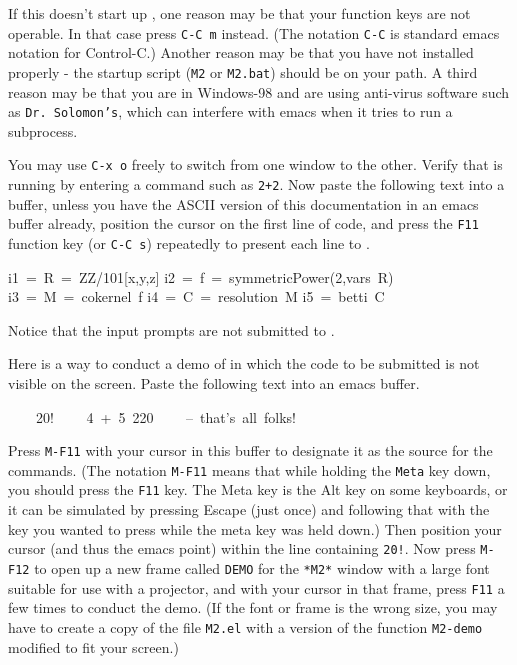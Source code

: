 If this doesn't start up \Mtwo, one reason may be that your function
keys are not operable.  In that case press {\tt {}C-C\ m} instead.  (The 
notation {\tt {}C-C} is standard emacs notation for Control-C.)  Another
reason may be that you have not installed \Mtwo properly - the startup
script ({\tt {}M2} or {\tt {}M2.bat}) should be on your path.
A third reason may be that you are in Windows-98 and are using anti-virus 
software such as {\tt {}Dr.\ Solomon's}, which can interfere with emacs 
when it tries to run a subprocess.

You may use {\tt {}C-x\ o} freely to switch from one window to the other.
Verify that \Mtwo is running by entering a command such as {\tt {}2+2}.  
Now paste the following text into a buffer, unless you have the ASCII
version of this documentation in an emacs buffer already, position
the cursor on the first line of code, and press the {\tt {}F11} function 
key (or {\tt {}C-C\ s}) repeatedly to present each line to \Mtwo.

\smallskip

{\ttfamily\obeylines
i1~=~R~=~ZZ/101[x,y,z]
i2~=~f~=~symmetricPower(2,vars~R)
i3~=~M~=~cokernel~f
i4~=~C~=~resolution~M
i5~=~betti~C
}

\smallskip

Notice that the input prompts are not submitted to \Mtwo.

Here is a way to conduct a demo of \Mtwo in which the code to be
submitted is not visible on the screen.  Paste the following text into
an emacs buffer.

\smallskip

{\ttfamily\obeylines
~~~~20!
~~~~4~+~5~2{}20
~~~~--~that's~all~folks!
}

\smallskip

Press {\tt {}M-F11} with your cursor in this buffer to designate it as
the source for the \Mtwo commands.  (The notation {\tt {}M-F11} means 
that while holding the {\tt {}Meta} key down, you should press the {\tt {}F11} 
key.  The Meta key is the Alt key on some keyboards, or it can be simulated by 
pressing Escape (just once) and following that with the key you wanted to press 
while the meta key was held down.)  Then position your cursor (and thus the 
emacs point) within the line containing {\tt {}20!}.  Now press {\tt {}M-F12}
to open up a new frame called {\tt {}DEMO} for the {\tt {}*M2*} window with
a large font suitable for use with a projector, and with your cursor in that
frame, press {\tt {}F11} a few times to conduct the demo.  (If the font or frame is the
wrong size, you may have to create a copy of the file {\tt {}M2.el}
with a version of the function {\tt {}M2-demo} modified to fit your screen.)

